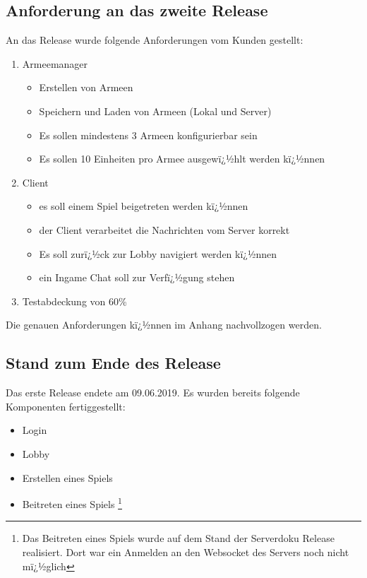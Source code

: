 \documentclass[12pt, titlepage]{scrartcl}
\newcommand{\RN}[1]{%
	\textup{\uppercase\expandafter{\romannumeral#1}}%
}
\begin{document}
		\subsection{Anforderung an das zweite Release}
			An das Release wurde folgende Anforderungen vom Kunden gestellt:
			\begin{enumerate}
				\item Armeemanager
				\begin{itemize}
					\item Erstellen von Armeen 
					\item Speichern und Laden von Armeen (Lokal und Server)
					\item Es sollen mindestens 3 Armeen konfigurierbar sein
					\item Es sollen 10 Einheiten pro Armee ausgewï¿½hlt werden kï¿½nnen
				\end{itemize}
				\item Client
					\begin{itemize}
						\item es soll einem Spiel beigetreten werden kï¿½nnen
						\item der Client verarbeitet die Nachrichten vom Server korrekt
						\item Es soll zurï¿½ck zur Lobby navigiert werden kï¿½nnen
						\item ein Ingame Chat soll zur Verfï¿½gung stehen
					\end{itemize}
				\item Testabdeckung von 60\%
			\end{enumerate}
		Die genauen Anforderungen kï¿½nnen im Anhang %
		nachvollzogen werden.
		
		\subsection{Stand zum Ende des Release \RN{1}}
		Das erste Release endete am 09.06.2019. Es wurden bereits folgende Komponenten fertiggestellt:
		\begin{itemize}
			\item Login
			\item Lobby
			\item Erstellen eines Spiels
			\item Beitreten eines Spiels \footnote{Das Beitreten eines Spiels wurde auf dem Stand der Serverdoku Release \RN{1} realisiert. Dort war ein Anmelden an den Websocket des Servers noch nicht mï¿½glich}
		\end{itemize}
\end{document}
